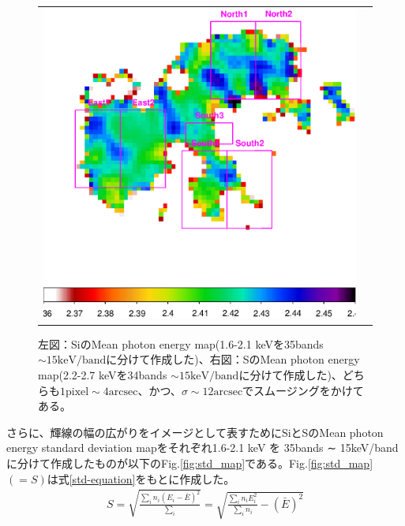 \documentclass[a4j]{jarticle}%
\begin{document}
\begin{figure}[H]
\begin{center}
\begin{tabular}{cc}
  \begin{minipage}{0.5\hsize}
  \begin{center}
  \includegraphics[scale=0.50]{./S_mean.eps}
  \end{center}
  \end{minipage}
  \end{tabular}
  \caption{左図：SiのMean photon energy map(1.6-2.1 keVを35bands $\sim 15 \textrm{keV/band}$に分けて作成した)、右図：SのMean photon energy map(2.2-2.7 keVを34bands $\sim 15 \textrm{keV/band}$に分けて作成した)、どちらも$1\textrm{pixel} \sim 4\textrm{arcsec}$、かつ、$\sigma \sim 12\textrm{arcsec}$でスムージングをかけてある。}
  \label{fig:mpe_map}
  \end{center}
\end{figure}

さらに、輝線の幅の広がりをイメージとして表すためにSiとSのMean photon energy standard  deviation mapをそれぞれ1.6-2.1 keV を 35bands ∼ 15keV/band に分けて作成したものが以下のFig.\ref{fig:std_map}である。Fig.\ref{fig:std_map}$(=S)$は式\ref{std-equation}をもとに作成した。
\begin{align}
  S = \sqrt{\frac{\sum_{i} n_{i}(E_{i}-\bar{E})^2}{\sum_{i} }} = \sqrt{\frac{\sum_{i} n_{i} E^{2}_{i}}{\sum_{i} n_{i}}-(\bar{E})^2} \label{std-equation}
\end{align}
\end{document}
